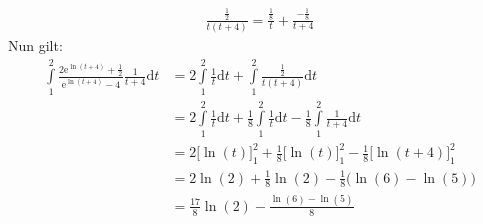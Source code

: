 \begin{align*}
\frac{\frac{1}{2}}{t(t+4)} =\frac{\mathrm{\frac{1}{8}}}{t}+\frac{\mathrm{-\frac{1}{8}}}{t+4}
\end{align*}
Nun gilt:\\
\begin{align*}
\int\limits_{1}^{2} \frac{2\mathrm{e}^{\ln(t+4)}+\frac{1}{2}}{\mathrm{e}^{\ln(t+4)}-4}\frac{1}{t+4}\mathrm{d}t&=2\int\limits_{1}^{2} \frac{1}{t}\mathrm{d}t+\int\limits_{1}^{2} \frac{\frac{1}{2}}{t(t+4)}\mathrm{d}t\\
&=2\int\limits_{1}^{2}\frac{1}{t} \mathrm{d}t+\frac{1}{8}\int\limits_{1}^{2} \frac{1}{t}\mathrm{d}t-\frac{1}{8}\int\limits_{1}^{2} \frac{1}{t+4}\mathrm{d}t\\
&=2\bigg[\ln(t)\bigg]^2_1+\frac{1}{8}\bigg[\ln(t)\bigg]^2_1-\frac{1}{8}\bigg[\ln(t+4)\bigg]^2_1\\
&=2\ln(2)+\frac{1}{8}\ln(2)-\frac{1}{8}\big(\ln(6)-\ln(5)\big)\\
&=\frac{17}{8}\ln(2)-\frac{\ln(6)-\ln(5)}{8}
\end{align*}
